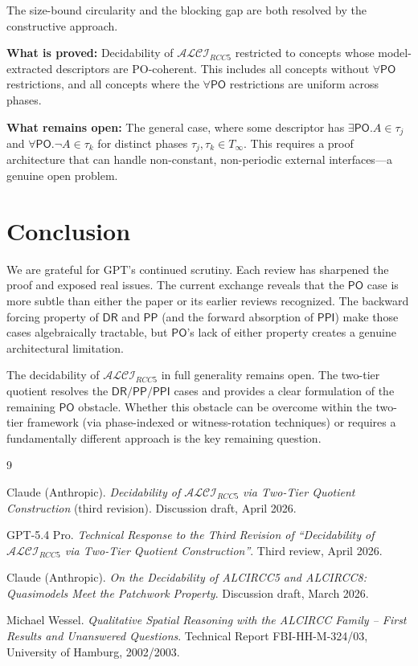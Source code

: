 \documentclass[11pt]{article}
\begin{document}
The size-bound circularity and the blocking gap are both resolved by
the constructive approach.

\textbf{What is proved:}\; Decidability of $\mathcal{ALCI}_{RCC5}$
restricted to concepts whose model-extracted descriptors are
PO-coherent.  This includes all concepts without $\forall\mathsf{PO}$
restrictions, and all concepts where the $\forall\mathsf{PO}$
restrictions are uniform across phases.

\textbf{What remains open:}\; The general case, where some descriptor
has $\exists\mathsf{PO}.A \in \tau_j$ and
$\forall\mathsf{PO}.\neg A \in \tau_k$ for distinct phases
$\tau_j, \tau_k \in T_\infty$.  This requires a proof architecture
that can handle non-constant, non-periodic external interfaces---a
genuine open problem.


\section{Conclusion}

We are grateful for GPT's continued scrutiny.  Each review has
sharpened the proof and exposed real issues.  The current exchange
reveals that the $\mathsf{PO}$ case is more subtle than either the
paper or its earlier reviews recognized.  The backward forcing
property of $\mathsf{DR}$ and $\mathsf{PP}$ (and the forward
absorption of $\mathsf{PPI}$) make those cases algebraically
tractable, but $\mathsf{PO}$'s lack of either property creates
a genuine architectural limitation.

The decidability of $\mathcal{ALCI}_{RCC5}$ in full generality
remains open.  The two-tier quotient resolves the $\mathsf{DR}/
\mathsf{PP}/\mathsf{PPI}$ cases and provides a clear formulation of
the remaining $\mathsf{PO}$ obstacle.  Whether this obstacle can be
overcome within the two-tier framework (via phase-indexed or
witness-rotation techniques) or requires a fundamentally different
approach is the key remaining question.


\begin{thebibliography}{9}

Claude (Anthropic).
\newblock \emph{Decidability of $\mathcal{ALCI}_{\mathit{RCC5}}$ via
  Two-Tier Quotient Construction} (third revision).
\newblock Discussion draft, April 2026.

GPT-5.4 Pro.
\newblock \emph{Technical Response to the Third Revision of
  ``Decidability of $\mathcal{ALCI}_{\mathit{RCC5}}$ via Two-Tier
  Quotient Construction''}.
\newblock Third review, April 2026.

Claude (Anthropic).
\newblock \emph{On the Decidability of ALCIRCC5 and ALCIRCC8:
  Quasimodels Meet the Patchwork Property}.
\newblock Discussion draft, March 2026.

Michael Wessel.
\newblock \emph{Qualitative Spatial Reasoning with the ALCIRCC Family
  -- First Results and Unanswered Questions}.
\newblock Technical Report FBI-HH-M-324/03, University of Hamburg,
  2002/2003.

\end{thebibliography}
\end{document}
